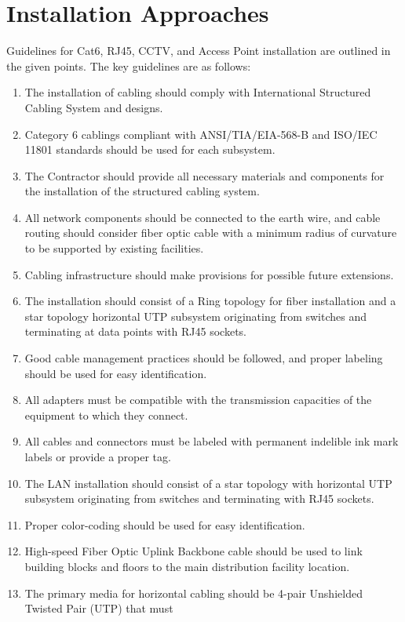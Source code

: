 \documentclass[12pt]{article}
\begin{document}
\section{Installation Approaches}
Guidelines for Cat6, RJ45, CCTV, and Access Point installation are outlined in the given points. 
The key guidelines are as follows:
\begin{enumerate}
    \item The installation of cabling should comply with International Structured Cabling System and designs.
    \item Category 6 cablings compliant with ANSI/TIA/EIA-568-B and ISO/IEC 11801 standards should be
    used for each subsystem.
    \item The Contractor should provide all necessary materials and components for the installation of the
    structured cabling system.
    \item All network components should be connected to the earth wire, and cable routing should consider
    fiber optic cable with a minimum radius of curvature to be supported by existing facilities.
    \item Cabling infrastructure should make provisions for possible future extensions.
    \item The installation should consist of a Ring topology for fiber installation and a star topology horizontal
    UTP subsystem originating from switches and terminating at data points with RJ45 sockets.
    \item Good cable management practices should be followed, and proper labeling should be used for easy
    identification.
    \item All adapters must be compatible with the transmission capacities of the equipment to which they
    connect.
    \item All cables and connectors must be labeled with permanent indelible ink mark labels or provide a
    proper tag.
    \item The LAN installation should consist of a star topology with horizontal UTP subsystem originating
    from switches and terminating with RJ45 sockets.
    \item Proper color-coding should be used for easy identification.
    \item High-speed Fiber Optic Uplink Backbone cable should be used to link building blocks and floors to
    the main distribution facility location.
    \item The primary media for horizontal cabling should be 4-pair Unshielded Twisted Pair (UTP) that must

\end{enumerate}
\end{document}
